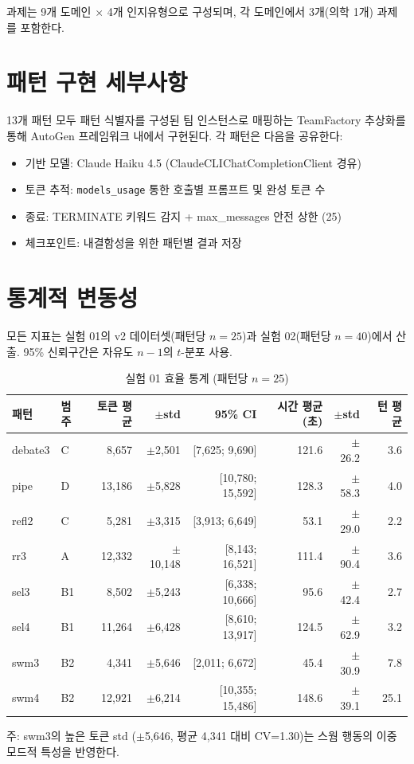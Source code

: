 \documentclass[a4paper,11pt]{article}
\begin{document}
과제는 9개 도메인 $\times$ 4개 인지유형으로 구성되며, 각 도메인에서 3개(의학 1개) 과제를 포함한다.

\section{패턴 구현 세부사항}
\label{app:pattern-impl}

13개 패턴 모두 패턴 식별자를 구성된 팀 인스턴스로 매핑하는 TeamFactory 추상화를 통해 AutoGen 프레임워크 내에서 구현된다. 각 패턴은 다음을 공유한다:
\begin{itemize}
  \item 기반 모델: Claude Haiku 4.5 (ClaudeCLIChatCompletionClient 경유)
  \item 토큰 추적: \texttt{models\_usage} 통한 호출별 프롬프트 및 완성 토큰 수
  \item 종료: TERMINATE 키워드 감지 + max\_messages 안전 상한 (25)
  \item 체크포인트: 내결함성을 위한 패턴별 결과 저장
\end{itemize}

\section{통계적 변동성}
\label{app:variability}

모든 지표는 실험 01의 v2 데이터셋(패턴당 $n=25$)과 실험 02(패턴당 $n=40$)에서 산출. 95\% 신뢰구간은 자유도 $n-1$의 $t$-분포 사용.

\begin{table}[H]
\centering
\caption{실험 01 효율 통계 (패턴당 $n=25$)}
\label{tab:c1-exp01-stats}
{\footnotesize
\begin{tabular}{llrrrrrr}
\toprule
패턴 & 범주 & 토큰 평균 & $\pm$std & 95\% CI & 시간 평균(초) & $\pm$std & 턴 평균 \\
\midrule
debate3 & C  & 8,657  & $\pm$2,501  & [7,625; 9,690]   & 121.6 & $\pm$26.2  & 3.6 \\
pipe    & D  & 13,186 & $\pm$5,828  & [10,780; 15,592] & 128.3 & $\pm$58.3  & 4.0 \\
refl2   & C  & 5,281  & $\pm$3,315  & [3,913; 6,649]   & 53.1  & $\pm$29.0  & 2.2 \\
rr3     & A  & 12,332 & $\pm$10,148 & [8,143; 16,521]  & 111.4 & $\pm$90.4  & 3.6 \\
sel3    & B1 & 8,502  & $\pm$5,243  & [6,338; 10,666]  & 95.6  & $\pm$42.4  & 2.7 \\
sel4    & B1 & 11,264 & $\pm$6,428  & [8,610; 13,917]  & 124.5 & $\pm$62.9  & 3.2 \\
swm3    & B2 & 4,341  & $\pm$5,646  & [2,011; 6,672]   & 45.4  & $\pm$30.9  & 7.8 \\
swm4    & B2 & 12,921 & $\pm$6,214  & [10,355; 15,486] & 148.6 & $\pm$39.1  & 25.1 \\
\bottomrule
\end{tabular}
}

\smallskip
{\footnotesize 주: swm3의 높은 토큰 std ($\pm$5,646, 평균 4,341 대비 CV=1.30)는 스웜 행동의 이중 모드적 특성을 반영한다.}
\end{table}
\end{document}
